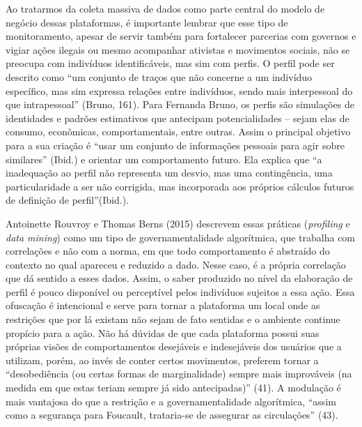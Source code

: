 Ao tratarmos da coleta massiva de dados como parte central do modelo de
negócio dessas plataformas, é importante lembrar que esse tipo de
monitoramento, apesar de servir também para fortalecer parcerias com
governos e vigiar ações ilegais ou mesmo acompanhar ativistas e
movimentos sociais, não se preocupa com indivíduos identificáveis, mas
sim com perfis. O perfil pode ser descrito como ``um conjunto de traços
que não concerne a um indivíduo específico, mas sim expressa relações
entre indivíduos, sendo mais interpessoal do que intrapessoal'' (Bruno,
161). Para Fernanda Bruno, os perfis são simulações de identidades e
padrões estimativos que antecipam potencialidades ­-- sejam elas de
consumo, econômicas, comportamentais, entre outras. Assim o principal
objetivo para a sua criação é ``usar um conjunto de informações pessoais
para agir sobre similares'' (Ibid.) e orientar um comportamento futuro.
Ela explica que ``a inadequação ao perfil não representa um desvio, mas
uma contingência, uma particularidade a ser não corrigida, mas
incorporada aos próprios cálculos futuros de definição de
perfil''(Ibid.).

Antoinette Rouvroy e Thomas Berns (2015) descrevem essas práticas
(\emph{profiling} e \emph{data mining}) como um tipo de
governamentalidade algorítmica, que trabalha com correlações e não com a
norma, em que todo comportamento é abstraído do contexto no qual
apareceu e reduzido a dado. Nesse caso, é a própria correlação que dá
sentido a esses dados. Assim, o saber produzido no nível da elaboração
de perfil é pouco disponível ou perceptível pelos indivíduos sujeitos a
essa ação. Essa ofuscação é intencional e serve para tornar a plataforma
um local onde as restrições que por lá existam não sejam de fato
sentidas e o ambiente continue propício para a ação. Não há dúvidas de
que cada plataforma possui suas próprias visões de comportamentos
desejáveis e indesejáveis dos usuários que a utilizam, porém, ao invés
de conter certos movimentos, preferem tornar a ``desobediência (ou
certas formas de marginalidade) sempre mais improváveis (na medida em
que estas teriam sempre já sido antecipadas)'' (41). A modulação é mais
vantajosa do que a restrição e a governamentalidade algorítmica, ``assim
como a segurança para Foucault, trataria-se de assegurar as
circulações'' (43).

